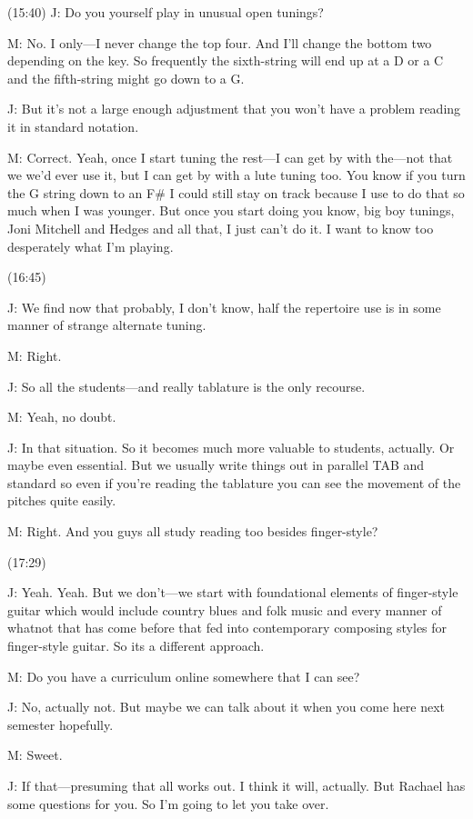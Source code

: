\documentclass[11pt]{article}
\begin{document}
(15:40)
J: Do you yourself play in unusual open tunings? 

M: No. I only---I never change the top four. And I'll change the bottom two depending on the key. So frequently the sixth-string will end up at a D or a C and the fifth-string might go down to a G. 

J: But it's not a large enough adjustment that you won't have a problem reading it in standard notation. 

M: Correct. Yeah, once I start tuning the rest---I can get by with the---not that we we'd ever use it, but I can get by with a lute tuning too. You know if you turn the G string down to an F\# I could still stay on track because I use to do that so much when I was younger. But once you start doing you know, big boy tunings, Joni Mitchell and Hedges and all that, I just can't do it. I want to know too desperately what I'm playing. 

(16:45)

J: We find now that probably, I don't know, half the repertoire use is in some manner of strange alternate tuning.

M: Right.

J: So all the students---and really tablature is the only recourse.

M: Yeah, no doubt.

J: In that situation. So it becomes much more valuable to students, actually. Or maybe even essential. But we usually write things out in parallel TAB and standard so even if you're reading the tablature you can see the movement of the pitches quite easily. 

M: Right. And you guys all study reading too besides finger-style?

(17:29)

J: Yeah. Yeah. But we don't---we start with foundational elements of finger-style guitar which would include country blues and folk music and every manner of whatnot that has come before that fed into contemporary composing styles for finger-style guitar. So its a different approach.

M: Do you have a curriculum online somewhere that I can see? 

J: No, actually not. But maybe we can talk about it when you come here next semester hopefully.

M: Sweet.

J: If that---presuming that all works out. I think it will, actually. But Rachael has some questions for you. So I'm going to let you take over.
\end{document}
